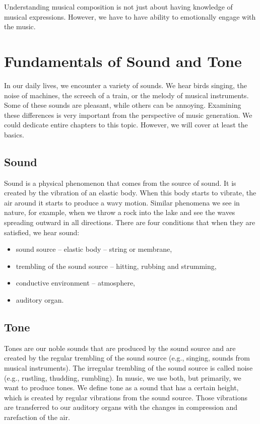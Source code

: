Understanding musical composition is not just about having knowledge of musical expressions. However, we have to have ability to emotionally engage with the music.

\section{Fundamentals of Sound and Tone}
In our daily lives, we encounter a variety of sounds. We hear birds singing, the noise of machines, the screech of a train, or the melody of musical instruments. Some of these sounds are pleasant, while others can be annoying. Examining these differences is very important from the perspective of music generation. We could dedicate entire chapters to this topic. However, we will cover at least the basics.

\subsection*{Sound}
Sound is a physical phenomenon that comes from the source of sound. It is created by the vibration of an elastic body. When this body starts to vibrate, the air around it starts to produce a wavy motion. Similar phenomena we see in nature, for example, when we throw a rock into the lake and see the waves spreading outward in all directions. There are four conditions that when they are satisfied, we hear sound:

\begin{itemize}
    \item{sound source -- elastic body -- string or membrane,}
    \item{trembling of the sound source -- hitting, rubbing and strumming,}
    \item{conductive environment -- atmosphere,}
    \item{auditory organ.}
\end{itemize}

\subsection*{Tone}
Tones are our noble sounds that are produced by the sound source and are created by the regular trembling of the sound source (e.g., singing, sounds from musical instruments). The irregular trembling of the sound source is called noise (e.g., rustling, thudding, rumbling). In music, we use both, but primarily, we want to produce tones. We define tone as a sound that has a certain height, which is created by regular vibrations from the sound source. Those vibrations are transferred to our auditory organs with the changes in compression and rarefaction of the air.

